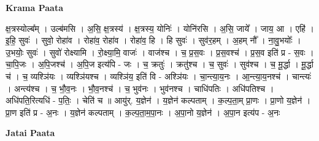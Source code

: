 \documentclass[17pt]{extarticle}
\begin{document}
\textbf{Krama Paata} \newline

क्ष॒त्रस्योल्ब᳚म् । उल्ब॑मसि । अ॒सि॒ क्ष॒त्रस्य॑ । क्ष॒त्रस्य॒ योनिः॑ । योनि॑रसि । अ॒सि॒ जाये᳚ । जाय॒ आ । एहि॑ । इ॒हि॒ सुवः॑ । सुवो॒ रोहा॑व । रोहा॑व॒ रोहा॑व । रोहा॑व॒ हि । हि सुवः॑ । सुव॑र॒हम् । अ॒हम् नौ᳚ । ना॒वु॒भयोः᳚ । उ॒भयोः॒ सुवः॑ । सुवो॑ रोक्ष्यामि । रो॒क्ष्या॒मि॒ वाजः॑ । वाज॑श्च । च॒ प्र॒स॒वः । प्र॒स॒वश्च॑ । प्र॒स॒व इति॑ प्र - स॒वः । चा॒पि॒जः । अ॒पि॒जश्च॑ । अ॒पि॒ज इत्य॑पि - जः । च॒ क्रतुः॑ । क्रतु॑श्च । च॒ सुवः॑ । सुव॑श्च । च॒ मू॒र्द्धा । मू॒र्द्धा च॑ । च॒ व्यश्ञि॑यः । व्यश्ञि॑यश्च । व्यश्ञि॑य॒ इति॑ वि - अश्ञि॑यः । चा॒न्त्या॒य॒नः । आ॒न्त्या॒य॒नश्च॑ । चान्त्यः॑ । अन्त्य॑श्च । च॒ भौ॒व॒नः । भौ॒व॒नश्च॑ । च॒ भुव॑नः । भुव॑नश्च । चाधि॑पतिः । अधि॑पतिश्च । अधि॑पति॒रित्यधि॑ - प॒तिः॒ । चेति॑ च ॥ आयु॑र्. य॒ज्ञेन॑ । य॒ज्ञेन॑ कल्पताम् । क॒ल्प॒ता॒म् प्रा॒णः । प्रा॒णो य॒ज्ञेन॑ । प्रा॒ण इति॑ प्र - अ॒नः । य॒ज्ञेन॑ कल्पताम् । क॒ल्प॒ता॒म॒पा॒नः । अ॒पा॒नो य॒ज्ञेन॑ । अ॒पा॒न इत्य॑प - अ॒नः \newline

\textbf{Jatai Paata} \newline
\end{document}
